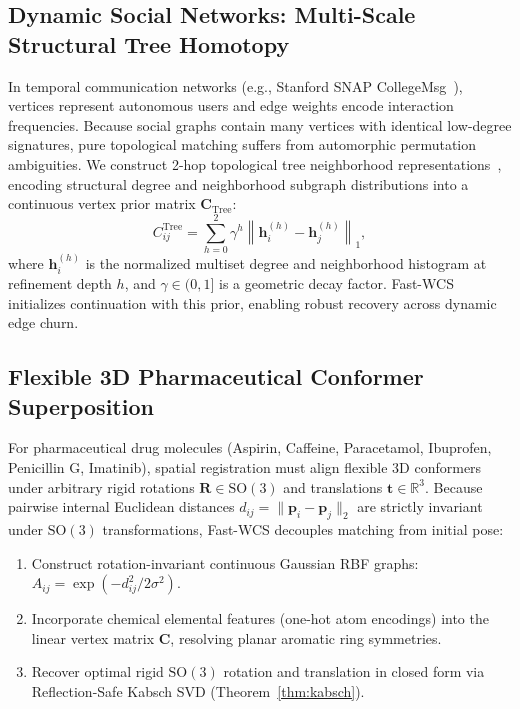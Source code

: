 \documentclass[a4paper,fleqn]{cas-dc}
\theoremstyle{thmstyleone}
\theoremstyle{thmstyletwo}
\theoremstyle{thmstylethree}
\begin{document}
\subsection{Dynamic Social Networks: Multi-Scale Structural Tree Homotopy}
In temporal communication networks (e.g., Stanford SNAP CollegeMsg~\cite{panzarasa2009}), vertices represent autonomous users and edge weights encode interaction frequencies. Because social graphs contain many vertices with identical low-degree signatures, pure topological matching suffers from automorphic permutation ambiguities. We construct 2-hop topological tree neighborhood representations~\cite{caetano2009learning, torresani2008feature}, encoding structural degree and neighborhood subgraph distributions into a continuous vertex prior matrix $\mathbf{C}_{\text{Tree}}$:
\begin{equation}
C_{ij}^{\text{Tree}} = \sum_{h=0}^2 \gamma^h \left\| \mathbf{h}_i^{(h)} - \mathbf{h}_j^{(h)} \right\|_1,
\label{eq:tree_prior}
\end{equation}
where $\mathbf{h}_i^{(h)}$ is the normalized multiset degree and neighborhood histogram at refinement depth $h$, and $\gamma \in (0, 1]$ is a geometric decay factor. Fast-WCS initializes continuation with this prior, enabling robust recovery across dynamic edge churn.

\subsection{Flexible 3D Pharmaceutical Conformer Superposition}
For pharmaceutical drug molecules (Aspirin, Caffeine, Paracetamol, Ibuprofen, Penicillin G, Imatinib), spatial registration must align flexible 3D conformers under arbitrary rigid rotations $\mathbf{R} \in \mathrm{SO}(3)$ and translations $\mathbf{t} \in \mathbb{R}^3$. Because pairwise internal Euclidean distances $d_{ij} = \|\mathbf{p}_i - \mathbf{p}_j\|_2$ are strictly invariant under $\mathrm{SO}(3)$ transformations, Fast-WCS decouples matching from initial pose:
\begin{enumerate}
    \item Construct rotation-invariant continuous Gaussian RBF graphs: $A_{ij} = \exp(-d_{ij}^2 / 2\sigma^2)$.
    \item Incorporate chemical elemental features (one-hot atom encodings) into the linear vertex matrix $\mathbf{C}$, resolving planar aromatic ring symmetries.
    \item Recover optimal rigid $\mathrm{SO}(3)$ rotation and translation in closed form via Reflection-Safe Kabsch SVD (Theorem~\ref{thm:kabsch}).
\end{enumerate}
\end{document}
